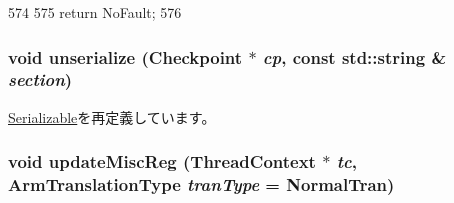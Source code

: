 \begin{DoxyCode}
574 {
575     return NoFault;
576 }
\end{DoxyCode}
\hypertarget{classArmISA_1_1TLB_af22e5d6d660b97db37003ac61ac4ee49}{
\subsubsection[{unserialize}]{\setlength{\rightskip}{0pt plus 5cm}void unserialize ({\bf Checkpoint} $\ast$ {\em cp}, \/  const std::string \& {\em section})}}
\label{classArmISA_1_1TLB_af22e5d6d660b97db37003ac61ac4ee49}


\hyperlink{classSerializable_af100c4e9feabf3cd918619c88c718387}{Serializable}を再定義しています。\hypertarget{classArmISA_1_1TLB_a7eb66b75612ed7e8b075cd89dfd2b157}{
\subsubsection[{updateMiscReg}]{\setlength{\rightskip}{0pt plus 5cm}void updateMiscReg ({\bf ThreadContext} $\ast$ {\em tc}, \/  {\bf ArmTranslationType} {\em tranType} = {\ttfamily NormalTran})}}
\label{classArmISA_1_1TLB_a7eb66b75612ed7e8b075cd89dfd2b157}



